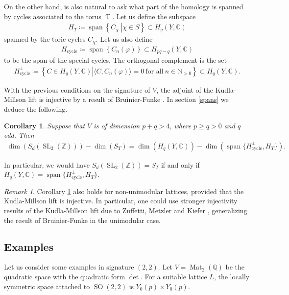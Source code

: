 \documentclass[11pt]{article} %
\newcommand{\8}{\infty}
\newcommand{\Z}{\mathbb{Z}}
\newcommand{\NN}{\mathbb{N}}
\newcommand{\Tbf}{\operatorname{T}}
\newcommand{\cycle}{\operatorname{cycle}}
\newcommand{\Span}{\operatorname{span}}
\newcommand{\SO}{\operatorname{SO}}
\newcommand{\SL}{\operatorname{SL}}
\newcommand{\Q}{\mathbb{Q}}
\newcommand{\C}{\mathbb{C}}
\newcommand{\Mat}{\operatorname{Mat}}
\theoremstyle{mytheoremstyle}
\newtheorem{cor}{Corollary}[thm]
\theoremstyle{remark}
\newtheorem{rmk}{Remark}[section]
\numberwithin{equation}{section}
\begin{document}
On the other hand, is also natural to ask what part of the homology is spanned by cycles associated to the torus $\Tbf$. Let us define the subspace
\begin{align}
    H_T \coloneqq \Span \left \{ \left . C_\chi \ \right \vert  \chi \in S\right \} \subset H_q(Y,\C)
\end{align}
spanned by the toric cycles $C_\chi$. Let us also define
\begin{align}
    H_{\cycle} \coloneqq \Span \left \{ C_n(\varphi) \right \} \subset H_{pq-q}(Y,\C)
\end{align}
to be the span of the special cycles. The orthogonal complement is the set
\begin{align}
    H_{\cycle}^\perp \coloneqq \left \{ \left . C \in H_q(Y,\C) \right \vert \langle C,C_n(\varphi) \rangle=0 \ \textrm{for all} \ n \in \NN_{>0} \right \} \subset H_q(Y,\C).
\end{align}

With the previous conditions on the signature of $V$, the adjoint of the Kudla-Millson lift is injective by a result of Bruinier-Funke \cite{bfinj}. In section \ref{spans} we deduce the following.

\begin{cor}\label{corollary121} Suppose that $V$ is of dimension $p+q>4$, where $p \geq q>0$ and $q$ odd. Then
\begin{align}
    \dim \left ( S_{d}(\SL_2(\Z)) \right )-\dim (S_T) = \dim \left ( H_q(Y,\C) \right ) -\dim \left ( \Span \{ H_{\cycle}^\perp , H_T \} \right ).
\end{align}
\end{cor}
In particular, we would have $S_{d}(\SL_2(\Z))=S_T$ if and only if $H_q(Y,\C)=\Span \{ H_{\cycle}^\perp , H_T \}$.

{ \begin{rmk} Corollary \ref{corollary121} also holds for non-unimodular lattices, provided that the Kudla-Millson lift is injective. In particular, one could use stronger injectivity results of the Kudla-Millson lift due to Zuffetti, Metzler and Kiefer \cite{zuffetti, mz23, kz23}, generalizing the result of Bruinier-Funke in the unimodular case. 
\end{rmk}}

\subsection{Examples} Let us consider some examples in signature $(2,2)$. Let $V=\Mat_2(\Q)$ be the quadratic space with the quadratic form $\det$. For a suitable lattice $L$, the locally symmetric space attached to $\SO(2,2)$ is $Y_0(p) \times Y_0(p)$.
\end{document}
